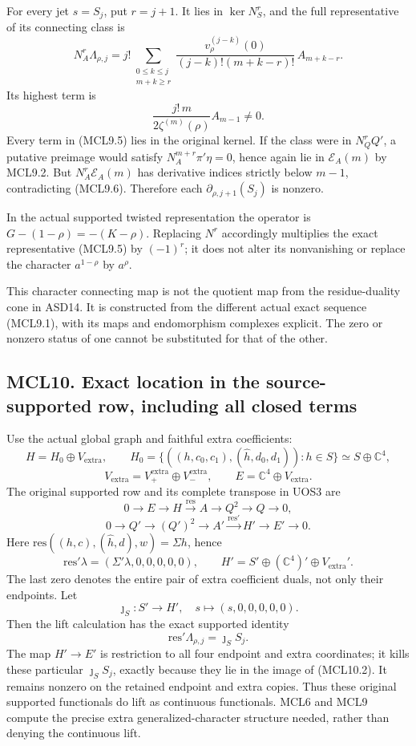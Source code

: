 For every jet \(s=S_j\), put \(r=j+1\). It lies in \(\ker N_S^r\), and
the full representative of its connecting class is \[
 \boxed{
 N_A^r\Lambda_{\rho,j}
 =j!\sum_{\substack{0\le k\le j\\m+k\ge r}}
 \frac{v_\rho^{(j-k)}(0)}
 {(j-k)!(m+k-r)!}\,A_{m+k-r}.
 }
 \tag{MCL9.5}
\] Its highest term is \[
 \frac{j!\,m}{2\zeta^{(m)}(\rho)}A_{m-1}\ne0.
 \tag{MCL9.6}
\] Every term in (MCL9.5) lies in the original kernel. If the class were
in \(N_Q^rQ'\), a putative preimage would satisfy
\(N_A^{m+r}\pi'\eta=0\), hence again lie in \(\mathcal E_A(m)\) by
MCL9.2. But \(N_A^r\mathcal E_A(m)\) has derivative indices strictly
below \(m-1\), contradicting (MCL9.6). Therefore each
\(\partial_{\rho,j+1}(S_j)\) is nonzero.

In the actual supported twisted representation the operator is
\(G-(1-\rho)=-(K-\rho)\). Replacing \(N^r\) accordingly multiplies the
exact representative (MCL9.5) by \((-1)^r\); it does not alter its
nonvanishing or replace the character \(a^{1-\rho}\) by \(a^\rho\).

This character connecting map is not the quotient map from the
residue-duality cone in ASD14. It is constructed from the different
actual exact sequence (MCL9.1), with its maps and endomorphism complexes
explicit. The zero or nonzero status of one cannot be substituted for
that of the other.

\subsection{MCL10. Exact location in the source-supported row, including
all closed
terms}\label{mcl10.-exact-location-in-the-source-supported-row-including-all-closed-terms}

Use the actual global graph and faithful extra coefficients: \[
 H=H_0\oplus V_{\mathrm{extra}},\qquad
 H_0=\{((h,c_0,c_1),(\widehat h,d_0,d_1)):h\in S\}
 \simeq S\oplus\mathbb C^4,
\] \[
 V_{\mathrm{extra}}=V_+^{\mathrm{extra}}\oplus V_-^{\mathrm{extra}},
 \qquad E=\mathbb C^4\oplus V_{\mathrm{extra}}.
\] The original supported row and its complete transpose in UOS3 are \[
 0\to E\to H\xrightarrow{\mathrm{res}}A
 \to Q^2\to Q\to0,
\] \[
 0\to Q'\to(Q')^2\to A'
 \xrightarrow{\mathrm{res}'}H'\to E'\to0.
 \tag{MCL10.1}
\] Here \(\mathrm{res}((h,c),(\widehat h,d),w)=\Sigma h\), hence \[
 \boxed{
 \mathrm{res}'\lambda
 =(\Sigma'\lambda,0,0,0,0,0),\qquad
 H'=S'\oplus(\mathbb C^4)'\oplus V_{\mathrm{extra}}'.
 }
 \tag{MCL10.2}
\] The last zero denotes the entire pair of extra coefficient duals, not
only their endpoints. Let \[
 \jmath_S:S'\to H',\quad
 s\mapsto(s,0,0,0,0,0).
\] Then the lift calculation has the exact supported identity \[
 \boxed{\mathrm{res}'\Lambda_{\rho,j}=\jmath_SS_j.}
 \tag{MCL10.3}
\] The map \(H'\to E'\) is restriction to all four endpoint and extra
coordinates; it kills these particular \(\jmath_SS_j\), exactly because
they lie in the image of (MCL10.2). It remains nonzero on the retained
endpoint and extra copies. Thus these original supported functionals do
lift as continuous functionals. MCL6 and MCL9 compute the precise extra
generalized-character structure needed, rather than denying the
continuous lift.

